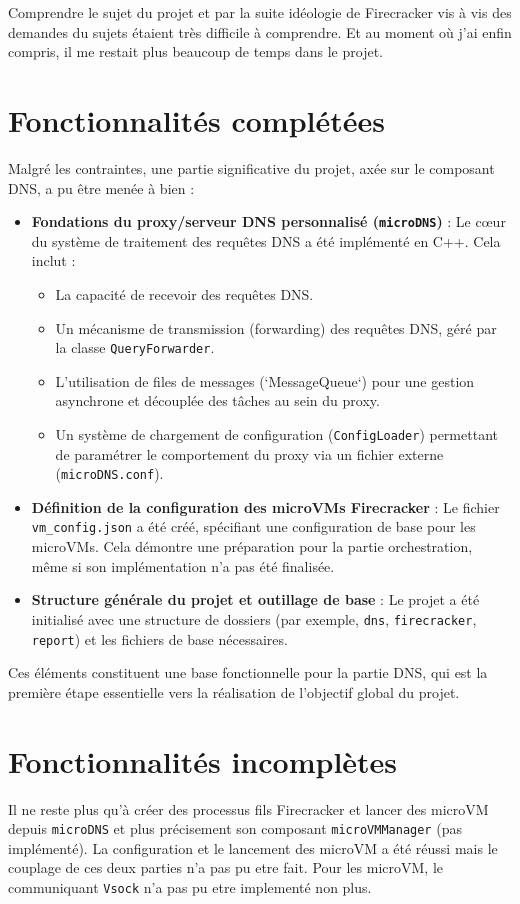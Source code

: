\documentclass[12pt]{article}
\begin{document}
Comprendre le sujet du projet et par la suite idéologie de Firecracker vis à vis des demandes du sujets étaient très difficile à comprendre. Et au moment où j'ai enfin compris, il me restait plus beaucoup de temps dans le projet.

\section{Fonctionnalités complétées}
Malgré les contraintes, une partie significative du projet, axée sur le composant DNS, a pu être menée à bien :

\begin{itemize}
    \item \textbf{Fondations du proxy/serveur DNS personnalisé (\texttt{microDNS})} : Le cœur du système de traitement des requêtes DNS a été implémenté en C++. Cela inclut :
        \begin{itemize}
            \item La capacité de recevoir des requêtes DNS.
            \item Un mécanisme de transmission (forwarding) des requêtes DNS, géré par la classe \texttt{QueryForwarder}.
            \item L'utilisation de files de messages (`MessageQueue`) pour une gestion asynchrone et découplée des tâches au sein du proxy.
            \item Un système de chargement de configuration (\texttt{ConfigLoader}) permettant de paramétrer le comportement du proxy via un fichier externe (\texttt{microDNS.conf}).
        \end{itemize}
    \item \textbf{Définition de la configuration des microVMs Firecracker} : Le fichier \texttt{vm\_config.json} a été créé, spécifiant une configuration de base pour les microVMs. Cela démontre une préparation pour la partie orchestration, même si son implémentation n'a pas été finalisée.
    \item \textbf{Structure générale du projet et outillage de base} : Le projet a été initialisé avec une structure de dossiers (par exemple, \texttt{dns}, \texttt{firecracker}, \texttt{report}) et les fichiers de base nécessaires.
\end{itemize}
Ces éléments constituent une base fonctionnelle pour la partie DNS, qui est la première étape essentielle vers la réalisation de l'objectif global du projet.

\section{Fonctionnalités incomplètes}
Il ne reste plus qu'à créer des processus fils Firecracker et lancer des microVM depuis \texttt{microDNS} et plus précisement son composant \texttt{microVMManager} (pas implémenté). La configuration et le lancement des microVM a été réussi mais le couplage de ces deux parties n'a pas pu etre fait. Pour les microVM, le communiquant \texttt{Vsock} n'a pas pu etre implementé non plus.
\end{document}
